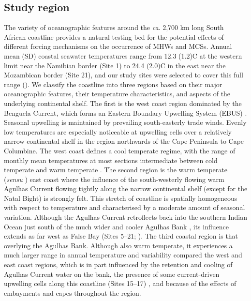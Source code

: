 \documentclass[a4paper,10pt,review]{elsarticle}
\begin{document}
\subsection{Study region}
The variety of oceanographic features around the \emph{ca}. 2,700 km long South African coastline provides a natural testing bed for the potential effects of different forcing mechanisms on the occurrence of MHWs and MCSs. Annual mean (SD) coastal seawater temperatures range from 12.3 (1.2)\degree C at the western limit near the Namibian border (Site 1) to 24.4 (2.0)\degree C in the east near the Mozambican border (Site 21), and our study sites were selected to cover this full range (). We classify the coastline into three regions based on their major oceanographic features, their temperature characteristics, and aspects of the underlying continental shelf. The first is the west coast region dominated by the Benguela Current, which forms an Eastern Boundary Upwelling System (EBUS) \cite{Hutchings2009}. Seasonal upwelling is maintained by prevailing south-easterly trade winds. Evenly low temperatures are especially noticeable at upwelling cells over a relatively narrow continental shelf in the region northwards of the Cape Peninsula to Cape Columbine. The west coast defines a cool temperate regime, with the range of monthly mean temperatures at most sections intermediate between cold temperate and warm temperate \cite{Luning1990}. The second region is the warm temperate (\emph{sensu}  \cite{Luning1990}) east coast where the influence of the south-westerly flowing warm Agulhas Current flowing tightly along the narrow continental shelf (except for the Natal Bight) is strongly felt. This stretch of coastline is spatially homogeneous with respect to temperature and characterised by a moderate amount of seasonal variation. Although the Agulhas Current retroflects back into the southern Indian Ocean \cite{Hutchings2009} just south of the much wider and cooler Agulhas Bank \cite{Roberts2005}, its influence extends as far west as False Bay (Sites 5--21; ). The third coastal region is that overlying the Agulhas Bank. Although also warm temperate, it experiences a much larger range in annual temperature and variability compared the west and east coast regions, which is in part influenced by the retention and cooling of Agulhas Current water on the bank, the presence of some current-driven upwelling cells along this coastline (Sites 15--17) \cite{Roberts2005}, and because of the effects of embayments and capes throughout the region.
\end{document}
